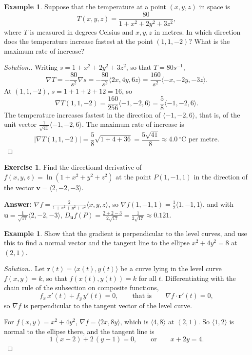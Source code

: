 \documentclass[11pt,a4paper]{article}
\theoremstyle{definition}
\newtheorem{exa}[thm]{Example}
\newtheorem{exe}[thm]{Exercise}
\newenvironment{solution}
  {\renewcommand{\qedsymbol}{}\begin{proof}[\textit{Solution}.]}
  {\end{proof}}
\begin{document}
\begin{exa}
\label{ex:temperature}
Suppose that the temperature at a point $(x,y,z)$ in space is
\[T(x,y,z) = \frac{80}{1 + x^2 + 2y^2 + 3z^2},\]
where $T$ is measured in degrees Celsius and $x,y,z$ in metres. In which
direction does the temperature increase fastest at the point $(1,1,-2)$? What is
the maximum rate of increase?
\end{exa}

\begin{solution}
Writing $s = 1 + x^2 + 2y^2 + 3z^2$, so that $T = 80s^{-1}$,
\[\nabla T = -\frac{80}{s^2}\nabla s = -\frac{80}{s^2}\langle 2x, 4y,
6z\rangle = \frac{160}{s^2}\langle -x, -2y, -3z\rangle .\]
At $(1,1,-2)$, $s = 1 + 1 + 2 + 12 = 16$, so
\[\nabla T (1,1,-2) = \frac{160}{256}\langle -1, -2, 6\rangle = \frac{5}{8}\langle
-1,-2,6\rangle .\]
The temperature increases fastest in the direction of $\langle -1,-2,6\rangle$,
that is, of the unit vector $\frac{1}{\sqrt{41}}\langle -1,-2,6\rangle$. The
maximum rate of increase is
\[|\nabla T(1,1,-2)| = \frac{5}{8}\sqrt{1 + 4 + 36} = \frac{5\sqrt{41}}{8}
\approx 4.0\ ^{\circ}\text{C per metre}.\]
\end{solution}

\begin{exe}
\label{exe:ln}
Find the directional derivative of $f(x,y,z) = \ln(1 + x^2 + y^2 + z^2)$ at the
point $P(1,-1,1)$ in the direction of the vector $\mathbf v = \langle 2,-2,
-3\rangle$.

\textbf{Answer:} $\nabla f = \frac{2}{1 + x^2+y^2+z^2}\langle x,y,z\rangle$, so
$\nabla f(1,-1,1) = \frac12\langle 1,-1,1\rangle$, and with
$\mathbf u = \frac{1}{\sqrt{17}}\langle 2,-2,-3\rangle$,
$D_{\mathbf u}f(P) = \frac{2 + 2 - 3}{2\sqrt{17}} = \frac{1}{2\sqrt{17}}\approx
0.121$.
\end{exe}

\begin{exa}
\label{ex:normal}
Show that the gradient is perpendicular to the level curves, and use this to find
a normal vector and the tangent line to the ellipse $x^2 + 4y^2 = 8$ at $(2,1)$.
\end{exa}

\begin{solution}
Let $\mathbf r(t) = \langle x(t),y(t)\rangle$ be a curve lying in the level curve
$f(x,y) = k$, so that $f(x(t),y(t)) = k$ for all $t$. Differentiating with the
chain rule of the subsection on composite functions,
\[f_x\,x'(t) + f_y\,y'(t) = 0,\qquad\text{that is}\qquad \nabla f\cdot\mathbf
r'(t) = 0 ,\]
so $\nabla f$ is perpendicular to the tangent vector of the level curve.

For $f(x,y) = x^2 + 4y^2$, $\nabla f = \langle 2x, 8y\rangle$, which is
$\langle 4,8\rangle$ at $(2,1)$. So $\langle 1,2\rangle$ is normal to the ellipse
there, and the tangent line is
\[1\,(x-2) + 2\,(y-1) = 0,\qquad\text{or}\qquad x + 2y = 4 .\]
\end{solution}
\end{document}
